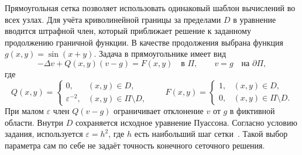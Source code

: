 Прямоугольная сетка позволяет использовать одинаковый шаблон вычислений во всех узлах.
Для учёта криволинейной границы за пределами $D$ в уравнение вводится штрафной член, который приближает решение к заданному продолжению граничной функции.
В качестве продолжения выбрана функция $g(x,y)=\sin(x+y)$.
Задача в прямоугольнике имеет вид
\begin{equation}
    -\Delta v+Q(x,y)(v-g)=F(x,y) \quad \text{в }\Pi,
    \qquad v=g \quad \text{на }\partial\Pi,
    \label{eq:penalty}
\end{equation}
где
\begin{equation}
    Q(x,y)=\begin{cases}0,&(x,y)\in D,\\ \varepsilon^{-2},&(x,y)\in\Pi\setminus D,\end{cases}
    \qquad
    F(x,y)=\begin{cases}1,&(x,y)\in D,\\0,&(x,y)\in\Pi\setminus D.\end{cases}
    \label{eq:coefficients}
\end{equation}
При малом $\varepsilon$ член $Q(v-g)$ ограничивает отклонение $v$ от $g$ в фиктивной области.
Внутри $D$ сохраняется исходное уравнение Пуассона.
Согласно условию задания, используется $\varepsilon=h^2$, где $h$ есть наибольший шаг сетки~\cite{assignment}.
Такой выбор параметра сам по себе не задаёт точность конечного сеточного решения.
